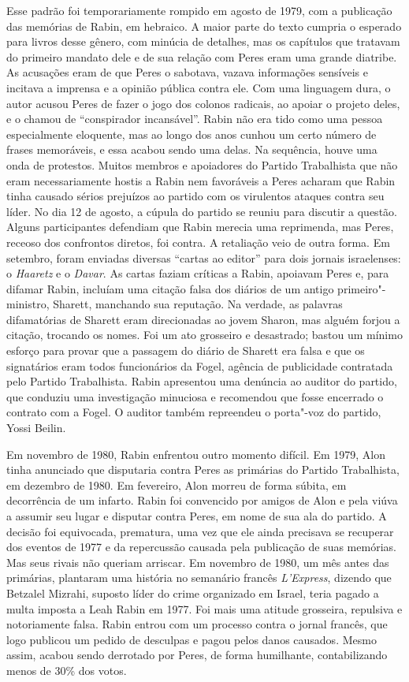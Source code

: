 Esse padrão foi temporariamente rompido em agosto de 1979, com a
publicação das memórias de Rabin, em hebraico. A maior parte do texto
cumpria o esperado para livros desse gênero, com minúcia de detalhes,
mas os capítulos que tratavam do primeiro mandato dele e de sua relação
com Peres eram uma grande diatribe. As acusações eram de que Peres o
sabotava, vazava informações sensíveis e incitava a imprensa e a opinião
pública contra ele. Com uma linguagem dura, o autor acusou Peres de
fazer o jogo dos colonos radicais, ao apoiar o projeto deles, e o chamou
de ``conspirador incansável''. Rabin não era tido como uma pessoa
especialmente eloquente, mas ao longo dos anos cunhou um certo número de
frases memoráveis, e essa acabou sendo uma delas. Na sequência, houve
uma onda de protestos. Muitos membros e apoiadores do Partido
Trabalhista que não eram necessariamente hostis a Rabin nem favoráveis a
Peres acharam que Rabin tinha causado sérios prejuízos ao partido com os
virulentos ataques contra seu líder. No dia 12 de agosto, a cúpula do
partido se reuniu para discutir a questão. Alguns participantes
defendiam que Rabin merecia uma reprimenda, mas Peres, receoso dos
confrontos diretos, foi contra. A retaliação veio de outra forma. Em
setembro, foram enviadas diversas ``cartas ao editor'' para dois jornais
israelenses: o \textit{Haaretz} e o \textit{Davar}. As cartas faziam
críticas a Rabin, apoiavam Peres e, para difamar Rabin, incluíam uma
citação falsa dos diários de um antigo primeiro"-ministro, Sharett,
manchando sua reputação. Na verdade, as palavras difamatórias de Sharett
eram direcionadas ao jovem Sharon, mas alguém forjou a citação, trocando
os nomes. Foi um ato grosseiro e desastrado; bastou um mínimo esforço
para provar que a passagem do diário de Sharett era falsa e que os
signatários eram todos funcionários da Fogel, agência de publicidade
contratada pelo Partido Trabalhista. Rabin apresentou uma denúncia ao
auditor do partido, que conduziu uma investigação minuciosa e recomendou
que fosse encerrado o contrato com a Fogel. O auditor também repreendeu
o porta"-voz do partido, Yossi Beilin.

Em novembro de 1980, Rabin enfrentou outro momento difícil. Em 1979,
Alon tinha anunciado que disputaria contra Peres as primárias do Partido
Trabalhista, em dezembro de 1980. Em fevereiro, Alon morreu de forma
súbita, em decorrência de um infarto. Rabin foi convencido por amigos de
Alon e pela viúva a assumir seu lugar e disputar contra Peres, em nome
de sua ala do partido. A decisão foi equivocada, prematura, uma vez que
ele ainda precisava se recuperar dos eventos de 1977 e da repercussão
causada pela publicação de suas memórias. Mas seus rivais não queriam
arriscar. Em novembro de 1980, um mês antes das primárias, plantaram uma
história no semanário francês \textit{L'Express}, dizendo que Betzalel
Mizrahi, suposto líder do crime organizado em Israel, teria pagado a
multa imposta a Leah Rabin em 1977. Foi mais uma atitude grosseira,
repulsiva e notoriamente falsa. Rabin entrou com um processo contra o
jornal francês, que logo publicou um pedido de desculpas e pagou pelos
danos causados. Mesmo assim, acabou sendo derrotado por Peres, de forma
humilhante, contabilizando menos de 30\% dos votos.

